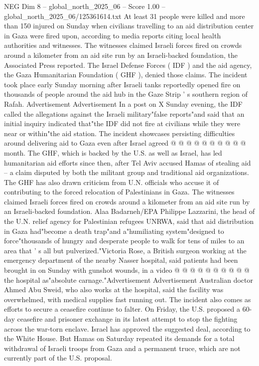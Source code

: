\begin{textsample}{NEG Dim 8 – global\_north\_2025\_06 – Score 1.00 – global\_north\_2025\_06/125361614.txt}  \label{ex:f8_neg_406}
At least 31 people were killed and more than 150 injured on Sunday when civilians travelling to an aid distribution center in Gaza were fired upon, according to media reports citing local health authorities and witnesses.
The witnesses claimed Israeli forces fired on crowds around a kilometer from an aid site run by an Israeli-backed foundation, the Associated Press reported.
The Israel Defense Forces ( IDF ) and the aid agency, the Gaza Humanitarian Foundation ( GHF ), denied those claims.
The incident took place early Sunday morning after Israeli tanks reportedly opened fire on thousands of people around the aid hub in the Gaze Strip ' s southern region of Rafah.
Advertisement Advertisement In a post on X Sunday evening, the IDF called the allegations against the Israeli military"false reports"and said that an initial inquiry indicated that"the IDF did not fire at civilians while they were near or within"the aid station.
The incident showcases persisting difficulties around delivering aid to Gaza even after Israel agreed @ @ @ @ @ @ @ @ @ @ month.
The GHF, which is backed by the U.S. as well as Israel, has led humanitarian aid efforts since then, after Tel Aviv accused Hamas of stealing aid -- a claim disputed by both the militant group and traditional aid organizations.
The GHF has also drawn criticism from U.N. officials who accuse it of contributing to the forced relocation of Palestinians in Gaza.
The witnesses claimed Israeli forces fired on crowds around a kilometer from an aid site run by an Israeli-backed foundation.
Alaa Badarneh/EPA Philippe Lazzarini, the head of the U.N. relief agency for Palestinian refugees UNRWA, said that aid distribution in Gaza had"become a death trap"and a"humiliating system"designed to force"thousands of hungry and desperate people to walk for tens of miles to an area that ' s all but pulverized."Victoria Rose, a British surgeon working at the emergency department of the nearby Nasser hospital, said patients had been brought in on Sunday with gunshot wounds, in a video @ @ @ @ @ @ @ @ @ @ the hospital as"absolute carnage."Advertisement Advertisement Australian doctor Ahmed Abu Sweid, who also works at the hospital, said the facility was overwhelmed, with medical supplies fast running out.
The incident also comes as efforts to secure a ceasefire continue to falter.
On Friday, the U.S. proposed a 60-day ceasefire and prisoner exchange in its latest attempt to stop the fighting across the war-torn enclave.
Israel has approved the suggested deal, according to the White House.
But Hamas on Saturday repeated its demands for a total withdrawal of Israeli troops from Gaza and a permanent truce, which are not currently part of the U.S. proposal.

\end{textsample}
